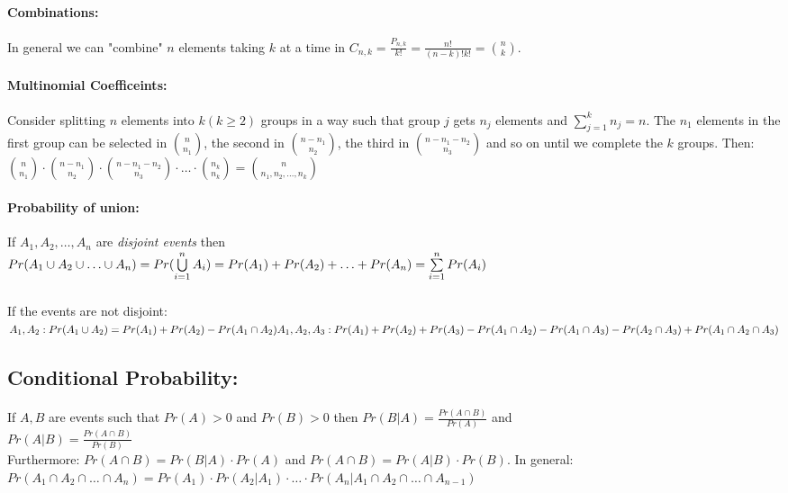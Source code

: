 \documentclass{article}[10pt]
\begin{document}
\begin{multicols}{2}
        \paragraph*{Combinations: }
            In general we can "combine" $n$ elements taking $k$ at a time in \(C_{n,k} = \frac{P_{n,k}}{k!} = \frac{n!}{(n-k)!k!} = {n \choose k} \). 

        \paragraph*{Multinomial Coefficeints: } 
            Consider splitting $n$ elements into $k (k \geq 2)$ groups in a way such that group $j$ gets $n_j$ elements and $\sum\limits_{j = 1}^{k}n_j = n$. The $n_1$ elements in the first group can be selected in ${n \choose n_1}$, the second in ${n-n_1 \choose n_2}$, the third in ${n-n_1-n_2 \choose n_3}$ and so on until we complete the $k$ groups. Then: ${n \choose n_1}\cdot{n-n_1 \choose n_2}\cdot{n-n_1-n_2 \choose n_3}\cdot \ldots \cdot{n_k \choose n_k} = {n \choose n_1, n_2, \ldots, n_k}$
        \paragraph*{Probability of union:}
            If $A_1, A_2, \ldots, A_n$ are \textit{disjoint events} then \\
            \(Pr(A_1 \cup A_2 \cup \ldots \cup A_n) \\
            = Pr(\bigcup\limits_{i=1}^{n}A_i) \\
            = Pr(A_1) + Pr(A_2) + \ldots + Pr(A_n) \\
            = \sum\limits_{i=1}^{n}Pr(A_i) \)
        \subparagraph*{} 
            If the events are not disjoint: \\
            \( A_1, A_2: Pr(A_1 \cup A_2) = Pr(A_1) + Pr(A_2) - Pr(A_1 \cap A_2) \\
            A_1, A_2, A_3: Pr(A_1) + Pr(A_2) + Pr(A_3) - Pr(A_1 \cap A_2) - Pr(A_1 \cap A_3) - Pr(A_2 \cap A_3) + Pr(A_1 \cap A_2 \cap A_3)\)     
        
    \subsection*{Conditional Probability: }
        \paragraph*{}
            If $A, B$ are events such that $Pr(A) > 0$ and $Pr(B) > 0$ then $Pr(B|A) = \frac{Pr(A\cap B)}{Pr(A)}$ and \\
            $Pr(A|B) = \frac{Pr(A \cap B)}{Pr(B)}$ \\
            Furthermore: $Pr(A \cap B) = Pr(B|A) \cdot Pr(A)$ and $Pr(A \cap B) = Pr(A|B) \cdot Pr(B)$. In general: $Pr(A_1 \cap A_2 \cap \ldots \cap A_n) = Pr(A_1) \cdot Pr(A_2 | A_1) \cdot \ldots \cdot Pr(A_n | A_1 \cap A_2 \cap \ldots \cap A_{n-1})$

\end{multicols}
\end{document}

